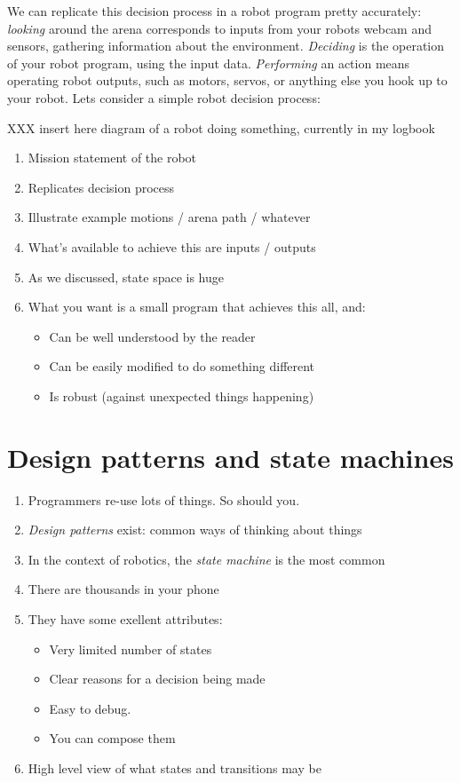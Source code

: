 \documentclass[a4paper,10pt]{article}
\begin{document}
We can replicate this decision process in a robot program pretty accurately:
\textit{looking} around the arena corresponds to inputs from your robots webcam
and sensors, gathering information about the environment. \textit{Deciding} is
the operation of your robot program, using the input data. \textit{Performing}
an action means operating robot outputs, such as motors, servos, or anything
else you hook up to your robot. Lets consider a simple robot decision process:

XXX insert here diagram of a robot doing something, currently in my logbook

\begin{enumerate}
\item Mission statement of the robot
\item Replicates decision process
\item Illustrate example motions / arena path / whatever
\item What's available to achieve this are inputs / outputs
\item As we discussed, state space is huge
\item What you want is a small program that achieves this all, and:
\begin{itemize}
	\item Can be well understood by the reader
	\item Can be easily modified to do something different
	\item Is robust (against unexpected things happening)
\end{itemize}
\end{enumerate}

\section{Design patterns and state machines}
\begin{enumerate}
\item Programmers re-use lots of things. So should you.
\item \textit{Design patterns} exist: common ways of thinking about things
\item In the context of robotics, the \textit{state machine} is the most common
\item There are thousands in your phone
\item They have some exellent attributes:
\begin{itemize}
	\item Very limited number of states
	\item Clear reasons for a decision being made
	\item Easy to debug.
	\item You can compose them
\end{itemize}
\item High level view of what states and transitions may be
\end{enumerate}
\end{document}
